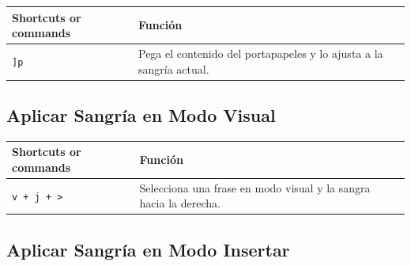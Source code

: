 \documentclass[
  doc,
  floatsintext,
  longtable,
  a4paper,
  nolmodern,
  notxfonts,
  notimes,
  12pt,
  colorlinks=true,linkcolor=blue,citecolor=blue,urlcolor=blue]{apa7}
\newcounter{none} %
\begin{document}
{\def\LTcaptype{none} %
\begin{longtable}[]{@{}
  >{\raggedright\arraybackslash}p{}
  >{\raggedright\arraybackslash}p{}@{}}
\toprule\noalign{}
\begin{minipage}[b]{\linewidth}\raggedright
Shortcuts or commands
\end{minipage} & \begin{minipage}[b]{\linewidth}\raggedright
Función
\end{minipage} \\
\midrule\noalign{}
\endhead
\bottomrule\noalign{}
\endlastfoot
\texttt{{]}p} & Pega el contenido del portapapeles y lo ajusta a la
sangría actual. \\
\end{longtable}
}

\subsection{Aplicar Sangría en Modo
Visual}\label{aplicar-sangruxeda-en-modo-visual}

{\def\LTcaptype{none} %
\begin{longtable}[]{@{}
  >{\raggedright\arraybackslash}p{}
  >{\raggedright\arraybackslash}p{}@{}}
\toprule\noalign{}
\begin{minipage}[b]{\linewidth}\raggedright
Shortcuts or commands
\end{minipage} & \begin{minipage}[b]{\linewidth}\raggedright
Función
\end{minipage} \\
\midrule\noalign{}
\endhead
\bottomrule\noalign{}
\endlastfoot
\texttt{v\ +\ j\ +\ \textgreater{}} & Selecciona una frase en modo
visual y la sangra hacia la derecha. \\
\end{longtable}
}

\subsection{Aplicar Sangría en Modo
Insertar}\label{aplicar-sangruxeda-en-modo-insertar}
\end{document}
